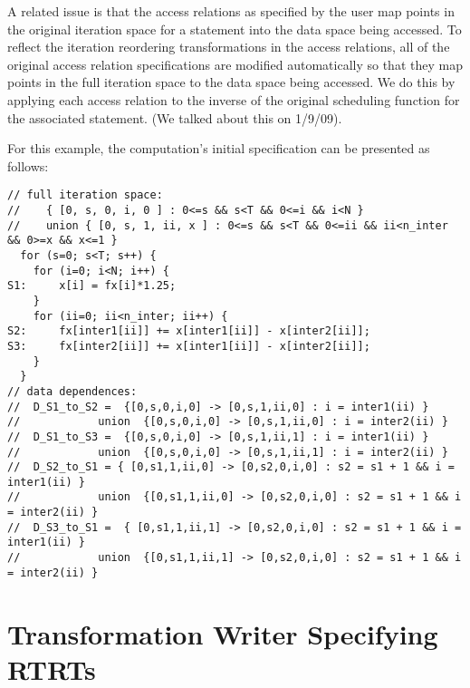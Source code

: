 \documentclass{article}
\begin{document}
A related issue is that the access relations as specified by the user map points in the original iteration space for a statement into the data space being accessed.  To reflect the iteration reordering transformations in the access relations, all of the original access relation specifications are modified automatically so that they map points in the full iteration space to the data space being accessed.  We do this by applying each access relation to the inverse of the original scheduling function for the associated statement. (We talked about this on 1/9/09).

For this example, the computation's initial specification can be presented as follows:

\begin{verbatim}
// full iteration space:
//    { [0, s, 0, i, 0 ] : 0<=s && s<T && 0<=i && i<N }
//    union { [0, s, 1, ii, x ] : 0<=s && s<T && 0<=ii && ii<n_inter && 0>=x && x<=1 }
  for (s=0; s<T; s++) {
    for (i=0; i<N; i++) {
S1:     x[i] = fx[i]*1.25;
    }
    for (ii=0; ii<n_inter; ii++) {
S2:     fx[inter1[ii]] += x[inter1[ii]] - x[inter2[ii]]; 
S3:     fx[inter2[ii]] += x[inter1[ii]] - x[inter2[ii]]; 
    }
  }
// data dependences:
//  D_S1_to_S2 =  {[0,s,0,i,0] -> [0,s,1,ii,0] : i = inter1(ii) }
//            union  {[0,s,0,i,0] -> [0,s,1,ii,0] : i = inter2(ii) }
//  D_S1_to_S3 =  {[0,s,0,i,0] -> [0,s,1,ii,1] : i = inter1(ii) }
//            union  {[0,s,0,i,0] -> [0,s,1,ii,1] : i = inter2(ii) }
//  D_S2_to_S1 = { [0,s1,1,ii,0] -> [0,s2,0,i,0] : s2 = s1 + 1 && i = inter1(ii) }
//            union  {[0,s1,1,ii,0] -> [0,s2,0,i,0] : s2 = s1 + 1 && i = inter2(ii) }
//  D_S3_to_S1 =  { [0,s1,1,ii,1] -> [0,s2,0,i,0] : s2 = s1 + 1 && i = inter1(ii) }
//            union  {[0,s1,1,ii,1] -> [0,s2,0,i,0] : s2 = s1 + 1 && i = inter2(ii) }
\end{verbatim}

\section{Transformation Writer Specifying RTRTs}
\end{document}
